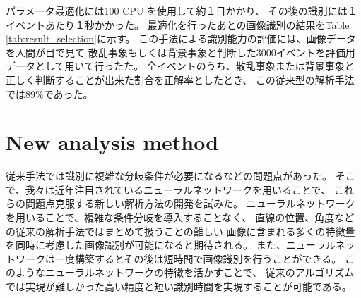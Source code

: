 \documentclass{jps-cp}
\begin{document}
パラメータ最適化には100 CPU を使用して約１日かかり、
その後の識別には１イベントあたり１秒かかった。
最適化を行ったあとの画像識別の結果をTable \ref{tab:result_selection}に示す。
この手法による識別能力の評価には、画像データを人間が目で見て
散乱事象もしくは背景事象と判断した3000イベントを評価用データとして用いて行ったた。
全イベントのうち、散乱事象または背景事象と正しく判断することが出来た割合を正解率としたとき、
この従来型の解析手法では89\%であった。

\section{New analysis method}


従来手法では識別に複雑な分岐条件が必要になるなどの問題点があった。
そこで、我々は近年注目されているニューラルネットワークを用いることで、
これらの問題点克服する新しい解析方法の開発を試みた。
ニューラルネットワークを用いることで、複雑な条件分岐を導入することなく、
直線の位置、角度などの従来の解析手法ではまとめて扱うことの難しい
画像に含まれる多くの特徴量を同時に考慮した画像識別が可能になると期待される。
また、ニューラルネットワークは一度構築するとその後は短時間で画像識別を行うことができる。
このようなニューラルネットワークの特徴を活かすことで、
従来のアルゴリズムでは実現が難しかった高い精度と短い識別時間を実現することが可能である。
\end{document}
